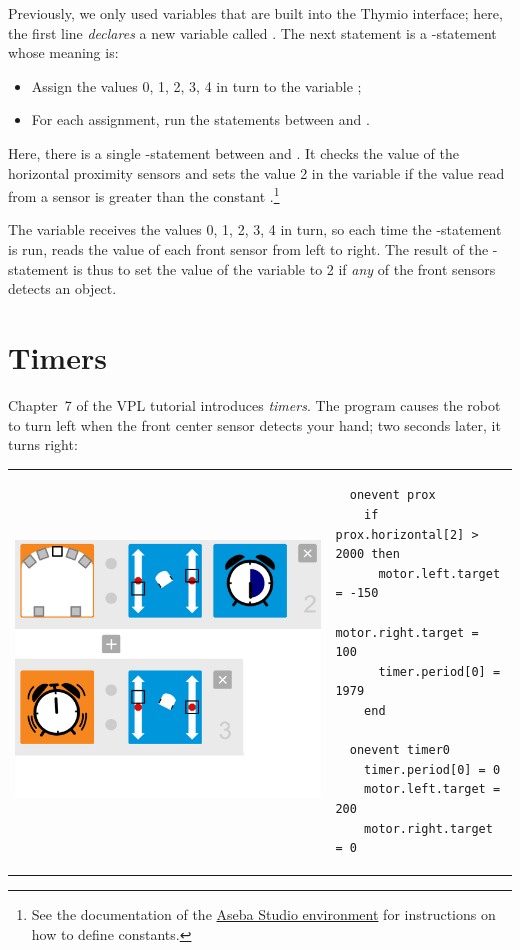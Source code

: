 \documentclass[11pt,a4paper,english]{report}
\begin{document}
Previously, we only used variables that are built into the Thymio
interface; here, the first line \emph{declares} a new variable called
. The next statement is a -statement whose meaning is:

\begin{itemize}
\item Assign the values 0, 1, 2, 3, 4 in turn to the variable ;
\item For each assignment, run the statements between  and .
\end{itemize}

Here, there is a single -statement between  and . It
checks the value of the horizontal proximity sensors and sets the value
2 in the variable  if the value read from a sensor is greater
than the constant .\footnote{See the documentation of the 
\href{https://aseba.wikidot.com/en:asebastudio}{Aseba Studio environment}
for instructions on how to define constants.}

The variable  receives the values 0, 1, 2, 3, 4 in turn, so each
time the -statement is run,  reads the value
of each front sensor from left to right. The result of the
-statement is thus to set the value of the variable  to
2 if \emph{any} of the front sensors detects an object.


\chapter{Timers}

Chapter~7 of the VPL tutorial introduces \emph{timers}. The program
 causes the robot to turn left when the front center sensor
detects your hand; two seconds later, it turns right:

\begin{center}
\begin{tabular}{ll}
\includegraphics[width=.4\textwidth]{shy} &
\begin{minipage}[b]{.5\textwidth}
\begin{footnotesize}
\begin{verbatim}
  onevent prox
    if prox.horizontal[2] > 2000 then
      motor.left.target = -150
      motor.right.target = 100
      timer.period[0] = 1979
    end
  
  onevent timer0
    timer.period[0] = 0
    motor.left.target = 200
    motor.right.target = 0
\end{verbatim}
\end{footnotesize}
\end{minipage}
\end{tabular}
\end{center}
\end{document}
